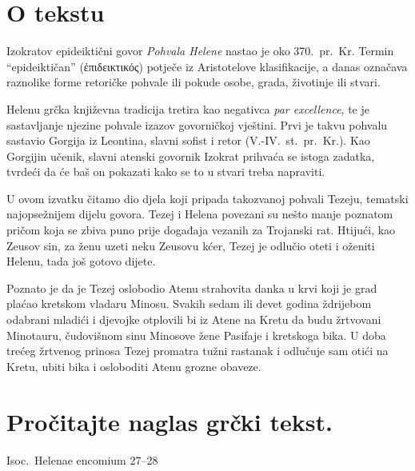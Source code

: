 


\section*{O tekstu}

Izokratov epideiktični govor \textit{Pohvala Helene} nastao je oko 370.\ pr.~Kr. Termin ``epideiktičan'' \textgreek[variant=ancient]{(ἐπιδεικτικός)} potječe iz Aristotelove klasifikacije, a danas označava raznolike forme retoričke pohvale ili pokude osobe, grada, životinje ili stvari.

Helenu grčka književna tradicija tretira kao negativca \textit{par excellence}, te je sastavljanje njezine pohvale izazov govorničkoj vještini. Prvi je takvu pohvalu sastavio Gorgija iz Leontina, slavni sofist i retor (V.-IV.~st.\ pr.~Kr.). Kao Gorgijin učenik, slavni atenski govornik Izokrat prihvaća se istoga zadatka, tvrdeći da će baš on pokazati kako se to u stvari treba napraviti.

U ovom izvatku čitamo dio djela koji pripada takozvanoj pohvali Tezeju, tematski najopsežnijem dijelu govora. Tezej i Helena povezani su nešto manje poznatom pričom koja se zbiva puno prije događaja vezanih za Trojanski rat. Htijući, kao Zeusov sin, za ženu uzeti neku Zeusovu kćer, Tezej je odlučio oteti i oženiti Helenu, tada još gotovo dijete. 

Poznato je da je Tezej oslobodio Atenu strahovita danka u krvi koji je grad plaćao kretskom vladaru Minosu. Svakih sedam ili devet godina ždrijebom odabrani mladići i djevojke otplovili bi iz Atene na Kretu da budu žrtvovani Minotauru, čudovišnom sinu Minosove žene Pasifaje i kretskoga bika. U doba trećeg žrtvenog prinosa Tezej promatra tužni rastanak i odlučuje sam otići na Kretu, ubiti bika i osloboditi Atenu grozne obaveze. 


\section*{Pročitajte naglas grčki tekst.}

Isoc.\ Helenae encomium 27–28


\medskip


